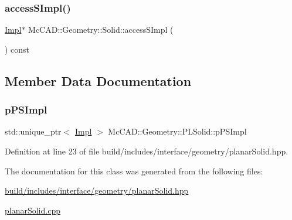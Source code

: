 \subsubsection{\texorpdfstring{access\+S\+Impl()}{accessSImpl()}\hspace{0.1cm}{\footnotesize\ttfamily [2/2]}}
{\footnotesize\ttfamily \hyperlink{classMcCAD_1_1Geometry_1_1PLSolid_1_1Impl}{Impl}$\ast$ Mc\+C\+A\+D\+::\+Geometry\+::\+Solid\+::access\+S\+Impl (\begin{DoxyParamCaption}{ }\end{DoxyParamCaption}) const\hspace{0.3cm}{\ttfamily [inherited]}}



\subsection{Member Data Documentation}
\mbox{\label{classMcCAD_1_1Geometry_1_1PLSolid_afdcf89bfac48acf8572e502b9b44d324}} 
\subsubsection{\texorpdfstring{p\+P\+S\+Impl}{pPSImpl}}
{\footnotesize\ttfamily std\+::unique\+\_\+ptr$<$ \hyperlink{classMcCAD_1_1Geometry_1_1PLSolid_1_1Impl}{Impl} $>$ Mc\+C\+A\+D\+::\+Geometry\+::\+P\+L\+Solid\+::p\+P\+S\+Impl\hspace{0.3cm}{\ttfamily [private]}}



Definition at line 23 of file build/includes/interface/geometry/planar\+Solid.\+hpp.



The documentation for this class was generated from the following files\+:\begin{DoxyCompactItemize}
\item 
\hyperlink{build_2includes_2interface_2geometry_2planarSolid_8hpp}{build/includes/interface/geometry/planar\+Solid.\+hpp}\item 
\hyperlink{planarSolid_8cpp}{planar\+Solid.\+cpp}\end{DoxyCompactItemize}
